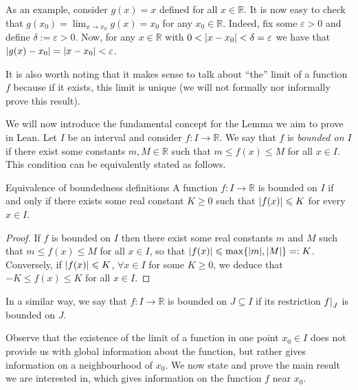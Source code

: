 \documentclass[a4paper,11pt]{article}
\theoremstyle{plain}
\newcommand\restr[2]{{%
		\left.\kern-\nulldelimiterspace %
		#1 %
		\littletaller %
		\right|_{#2} %
}}
\newcommand{\R}{\ensuremath{\mathbb{R}}} %
\newcommand{\littletaller}{\mathchoice{\vphantom{\big|}}{}{}{}}
\begin{document}
	As an example, consider $g(x)=x$ defined for all $x\in\R$. It is now easy to check that $g(x_0)=\lim_{x\rightarrow x_0} g(x)=x_0$ for any $x_0 \in \R$. Indeed, fix some $\varepsilon>0$ and define $\delta:=\varepsilon>0$. Now, for any $x\in\R$ with $0 < \abs{x-x_0} < \delta=\varepsilon$ we have that $\abs{g(x)-x_0}=\abs{x-x_0}<\varepsilon$.
	
	It is also worth noting that it makes sense to talk about ``the'' limit of a function $f$ because if it exists, this limit is unique (we will not formally nor informally prove this result).
	
	We will now introduce the fundamental concept for the Lemma we aim to prove in Lean. Let $I$ be an interval and consider $f : I \rightarrow \R$. We say that $f$ is \emph{bounded on $I$} if there exist some constants $m,M\in\R$ such that $m \leqslant f(x) \leqslant M$ for all $x \in I$. This condition can be equivalently stated as follows.\\
	
	\begin{lemma}{Equivalence of boundedness definitions}{}
		A function $f : I \rightarrow \R$ is bounded on $I$ if and only if there exists some real constant $K\geqslant0$ such that $\abs{f(x)} \leqslant K$ for every $x \in I$. 
	\end{lemma}
	\begin{proof}
		If $f$ is bounded on $I$ then there exist some real constants $m$ and $M$ such that $m \leqslant f(x) \leqslant M$ for all $x \in I$, so that $\abs{f(x)}\leqslant\max\{\abs{m},\abs{M}\}=:K$. Conversely, if $\abs{f(x)}\leqslant K$, $\forall x \in I$ for some $K\geqslant0$, we deduce that $-K \leqslant f(x) \leqslant K$ for all $x \in I$.
	\end{proof}
	
	In a similar way, we say that $f:I\rightarrow\R$ is bounded on $J\subseteq I$ if its restriction $\restr{f}{J}$ is bounded on $J$.
	
	Observe that the existence of the limit of a function in one point $x_0\in I$ does not provide us with global information about the function, but rather gives information on a neighbourhood of $x_0$. We now state and prove the main result we are interested in, which gives information on the function $f$ near $x_0$.\\
	
\end{document}
